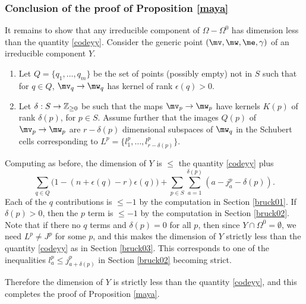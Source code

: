 \subsubsection{Conclusion of the proof of Proposition \ref{maya}}\label{bruck04}
It remains to  show that any irreducible component  of $\Omega-\Omega^0$ has dimension less than the quantity \eqref{codeyy}.  Consider the generic point $(\mv,\mw,\me,\gamma)$ of an irreducible component $Y$.
\begin{enumerate}
\item Let $Q=\{q_1,\dots,q_m\}$ be the set of points (possibly empty) not in $S$ such that for $q\in Q$, $\mv_q\to \mw_q$ has kernel of rank $\epsilon(q)>0$.
\item Let $\delta: S\to \Bbb{Z}_{\geq 0}$ be such that the maps $\mv_p\to\mw_p$ have kernels $K(p)$ of rank $\delta(p)$, for $p\in S$. Assume further that the images $Q(p)$ of $\mv_p\to\mw_p$ are  $r-\delta(p)$ dimensional subspaces of $\mw_q$  in the Schubert cells corresponding to $L^p=\{l^p_1,\dots,l^p_{r-\delta(p)}\}$.
\end{enumerate}
Computing as before, the dimension of  $Y$ is $\leq$ the quantity \eqref{codeyy} plus
$$\sum_{q\in Q} \bigl(1-(n+\epsilon(q)-r)\epsilon(q)\bigr) + \sum_{p\in S} \sum_{a=1}^{\delta(p)} (a-j^p_a-\delta(p)).$$
Each of the $q$ contributions is $\leq -1$ by the computation in Section \ref{bruck01}. If $\delta(p)>0$, then the $p$ term is $\leq -1$ by the computation in Section \ref{bruck02}. Note that if there no $q$ terms and $\delta(p)=0$ for all $p$, then since $Y\cap\Omega^0=\emptyset$, we need $L^p\neq J^p$ for some $p$, and this makes the dimension of $Y$ strictly less than  the quantity \eqref{codeyy} as in Section \ref{bruck03}. This corresponds to one of the inequalities $l^p_a\leq j^p_{a+\delta(p)}$ in Section \ref{bruck02} becoming strict.

Therefore the dimension of $Y$ is strictly less than the quantity \eqref{codeyy}, and this completes the proof of Proposition \ref{maya}.
